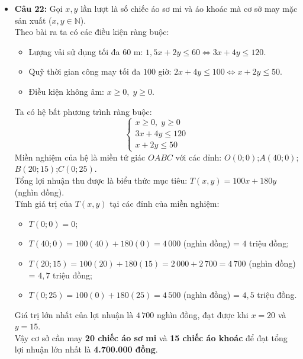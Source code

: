 \documentclass[12pt,a4paper]{article}
\begin{document}
\begin{itemize}[leftmargin=0.6cm, itemsep=2pt, topsep=1pt]
    \item \textbf{Câu 22:}
    Gọi $x, y$ lần lượt là số chiếc áo sơ mi và áo khoác mà cơ sở may mặc sản xuất ($x, y \in \mathbb{N}$).\\
    Theo bài ra ta có các điều kiện ràng buộc:
    \begin{itemize}[itemsep=1pt]
        \item Lượng vải sử dụng tối đa $60\text{ m}$: $1{,}5x + 2y \le 60 \iff 3x + 4y \le 120$.
        \item Quỹ thời gian công may tối đa $100$ giờ: $2x + 4y \le 100 \iff x + 2y \le 50$.
        \item Điều kiện không âm: $x \ge 0,\; y \ge 0$.
    \end{itemize}
    Ta có hệ bất phương trình ràng buộc:
    \[
    \begin{cases} x \ge 0,\; y \ge 0 \\ 3x + 4y \le 120 \\ x + 2y \le 50 \end{cases}
    \]
    Miền nghiệm của hệ là miền tứ giác $OABC$ với các đỉnh:
    $O(0; 0)$;\quad $A(40; 0)$;\quad $B(20; 15)$;\quad $C(0; 25)$.\\
    Tổng lợi nhuận thu được là biểu thức mục tiêu: $T(x, y) = 100x + 180y$ (nghìn đồng).\\
    Tính giá trị của $T(x, y)$ tại các đỉnh của miền nghiệm:
    \begin{itemize}[itemsep=1pt]
        \item $T(0; 0) = 0$;
        \item $T(40; 0) = 100(40) + 180(0) = 4\,000$ (nghìn đồng) = $4$ triệu đồng;
        \item $T(20; 15) = 100(20) + 180(15) = 2\,000 + 2\,700 = 4\,700$ (nghìn đồng) = $4,7$ triệu đồng;
        \item $T(0; 25) = 100(0) + 180(25) = 4\,500$ (nghìn đồng) = $4,5$ triệu đồng.
    \end{itemize}
    Giá trị lớn nhất của lợi nhuận là $4\,700$ nghìn đồng, đạt được khi $x = 20$ và $y = 15$.\\
    Vậy cơ sở cần may \textbf{20 chiếc áo sơ mi} và \textbf{15 chiếc áo khoác} để đạt tổng lợi nhuận lớn nhất là \textbf{4.700.000 đồng}.
\end{itemize}
\end{document}
